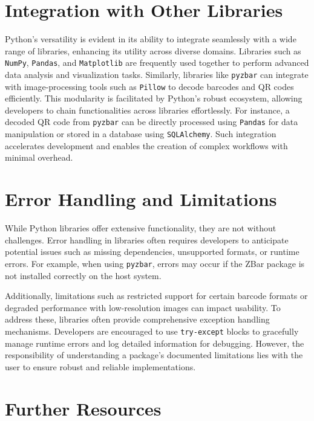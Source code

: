 \section{Integration with Other Libraries}

Python's versatility is evident in its ability to integrate seamlessly with a wide range of libraries, enhancing its utility across diverse domains. Libraries such as \texttt{NumPy}, \texttt{Pandas}, and \texttt{Matplotlib} are frequently used together to perform advanced data analysis and visualization tasks. Similarly, libraries like \texttt{pyzbar} can integrate with image-processing tools such as \texttt{Pillow} to decode barcodes and QR codes efficiently. This modularity is facilitated by Python’s robust ecosystem, allowing developers to chain functionalities across libraries effortlessly. For instance, a decoded QR code from \texttt{pyzbar} can be directly processed using \texttt{Pandas} for data manipulation or stored in a database using \texttt{SQLAlchemy}. Such integration accelerates development and enables the creation of complex workflows with minimal overhead.\cite{pyzbarpypi:2024}\\

\section{Error Handling and Limitations}
While Python libraries offer extensive functionality, they are not without challenges. Error handling in libraries often requires developers to anticipate potential issues such as missing dependencies, unsupported formats, or runtime errors. For example, when using \texttt{pyzbar}, errors may occur if the ZBar package is not installed correctly on the host system. \cite{pyzbarpypi:2024} 

Additionally, limitations such as restricted support for certain barcode formats or degraded performance with low-resolution images can impact usability. To address these, libraries often provide comprehensive exception handling mechanisms. Developers are encouraged to use \texttt{try-except} blocks to gracefully manage runtime errors and log detailed information for debugging. However, the responsibility of understanding a package’s documented limitations lies with the user to ensure robust and reliable implementations.\cite{pyzbargithub:2024}


\section{Further Resources}

